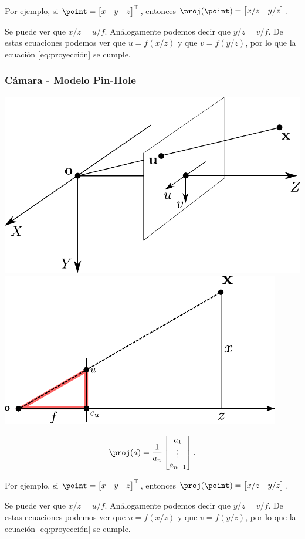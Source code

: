 \begin{frame}
	Por ejemplo, si $\point=\begin{bmatrix}x & y & z\end{bmatrix}^{\top}$, entonces $\proj(\point)=\begin{bmatrix}x/z & y/z\end{bmatrix}$.
	
	Se puede ver que $x/z=u/f$. Análogamente podemos decir que $y/z=v/f$. De estas ecuaciones podemos ver que $u=f(x/z)$ y que $v=f(y/z)$, por lo que la ecuación [eq:proyección] se cumple.
	
\end{frame}

\begin{frame}
	\frametitle{Cámara - Modelo Pin-Hole}
	
	\includegraphics[width=0.4\columnwidth]{images/camera/pinhole_camera_model.pdf}
	\includegraphics[width=0.4\columnwidth]{images/camera/pinhole_camera_model2.pdf}
	\footnotesize
	
	\begin{equation*}
		\proj(\vec{a})=
		\frac{1}{a_{n}}\begin{bmatrix}a_{1}\\
			\vdots\\
			a_{n-1}
		\end{bmatrix}.
	\end{equation*}
	
	Por ejemplo, si $\point=\begin{bmatrix}x & y & z\end{bmatrix}^{\top}$, entonces $\proj(\point)=\begin{bmatrix}x/z & y/z\end{bmatrix}$.
	
	Se puede ver que $x/z=u/f$. Análogamente podemos decir que $y/z=v/f$. De estas ecuaciones podemos ver que $u=f(x/z)$ y que $v=f(y/z)$, por lo que la ecuación [eq:proyección] se cumple.
	
\end{frame}


